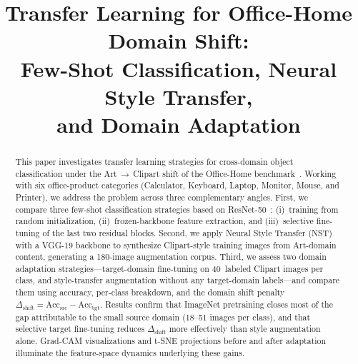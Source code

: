 \documentclass[conference]{IEEEtran}
\begin{document}
\title{Transfer Learning for Office-Home Domain Shift:\\
Few-Shot Classification, Neural Style Transfer,\\
and Domain Adaptation}


\author{
\and
{}
\and
{}
}

\maketitle

\begin{abstract}
This paper investigates transfer learning strategies for cross-domain object classification
under the Art\,$\to$\,Clipart shift of the Office-Home benchmark~\cite{venkateswara2017officehome}.
Working with six office-product categories (Calculator, Keyboard, Laptop, Monitor, Mouse,
and Printer), we address the problem across three complementary angles.
First, we compare three few-shot classification strategies based on ResNet-50~\cite{he2016resnet}:
(i)~training from random initialization, (ii)~frozen-backbone feature extraction, and
(iii)~selective fine-tuning of the last two residual blocks.
Second, we apply Neural Style Transfer (NST)~\cite{gatys2016nst} with a VGG-19 backbone to
synthesize Clipart-style training images from Art-domain content, generating a 180-image
augmentation corpus.
Third, we assess two domain adaptation strategies---target-domain fine-tuning on 40~labeled
Clipart images per class, and style-transfer augmentation without any target-domain labels---and
compare them using accuracy, per-class breakdown, and the domain shift penalty
$\Delta_{\text{shift}} = \text{Acc}_{\text{src}} - \text{Acc}_{\text{tgt}}$.
Results confirm that ImageNet pretraining closes most of the gap attributable to the small source
domain (18--51 images per class), and that selective target fine-tuning reduces $\Delta_{\text{shift}}$
more effectively than style augmentation alone.
Grad-CAM visualizations and t-SNE projections before and after adaptation illuminate the
feature-space dynamics underlying these gains.
\end{abstract}
\end{document}
